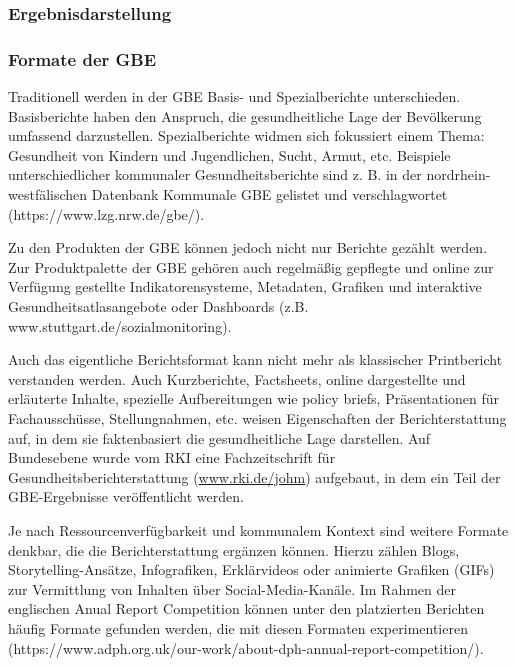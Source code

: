 \documentclass{article}
\begin{document}
\subsubsection{Ergebnisdarstellung}\label{H5142590}



\subsubsection{Formate der GBE}\label{H2213278}



Traditionell werden in der GBE Basis- und Spezialberichte unterschieden. Basisberichte haben den Anspruch, die gesundheitliche Lage der Bevölkerung umfassend darzustellen. Spezialberichte widmen sich fokussiert einem Thema: Gesundheit von Kindern und Jugendlichen, Sucht, Armut, etc. Beispiele unterschiedlicher kommunaler Gesundheitsberichte sind z. B. in der nordrhein-westfälischen Datenbank Kommunale GBE gelistet und verschlagwortet (https://www.lzg.nrw.de/gbe/).


Zu den Produkten der GBE können jedoch nicht nur Berichte gezählt werden. Zur Produktpalette der GBE  gehören auch regelmäßig gepflegte und online zur Verfügung gestellte Indikatorensysteme, Metadaten, Grafiken und interaktive Gesundheitsatlasangebote oder Dashboards (z.B. www.stuttgart.de/sozialmonitoring). 


Auch das eigentliche Berichtsformat kann nicht mehr als klassischer Printbericht verstanden werden. Auch Kurzberichte, Factsheets, online dargestellte und erläuterte Inhalte, spezielle Aufbereitungen wie policy briefs, Präsentationen für Fachausschüsse, Stellungnahmen, etc. weisen Eigenschaften der Berichterstattung auf, in dem sie faktenbasiert die gesundheitliche Lage darstellen. Auf Bundesebene wurde vom RKI eine Fachzeitschrift für Gesundheitsberichterstattung (\href{http://www.rki.de/johm}{www.rki.de/johm}) aufgebaut, in dem ein Teil der GBE-Ergebnisse veröffentlicht werden.\autocite{SaßAnkeundweitere2018}


Je nach Ressourcenverfügbarkeit und kommunalem Kontext sind weitere Formate denkbar, die die Berichterstattung ergänzen können. Hierzu zählen Blogs, Storytelling-Ansätze, Infografiken, Erklärvideos oder animierte Grafiken (GIFs) zur Vermittlung von Inhalten über Social-Media-Kanäle. Im Rahmen der englischen Anual Report Competition können unter den platzierten Berichten häufig Formate gefunden werden, die mit diesen Formaten experimentieren (https://www.adph.org.uk/our-work/about-dph-annual-report-competition/).
\end{document}
